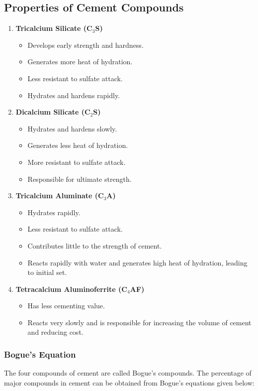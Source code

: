 \documentclass[a4paper,11pt]{book}
\begin{document}
\subsection*{Properties of Cement Compounds}
\begin{enumerate}
    \item \textbf{Tricalcium Silicate (C$_3$S)}
    \begin{itemize}
        \item Develops early strength and hardness.
        \item Generates more heat of hydration.
        \item Less resistant to sulfate attack.
        \item Hydrates and hardens rapidly.
    \end{itemize}
    \item \textbf{Dicalcium Silicate (C$_2$S)}
    \begin{itemize}
        \item Hydrates and hardens slowly.
        \item Generates less heat of hydration.
        \item More resistant to sulfate attack.
        \item Responsible for ultimate strength.
    \end{itemize}
    \item \textbf{Tricalcium Aluminate (C$_3$A)}
    \begin{itemize}
        \item Hydrates rapidly.
        \item Less resistant to sulfate attack.
        \item Contributes little to the strength of cement.
        \item Reacts rapidly with water and generates high heat of hydration, leading to initial set.
    \end{itemize}
    \item \textbf{Tetracalcium Aluminoferrite (C$_4$AF)}
    \begin{itemize}
        \item Has less cementing value.
        \item Reacts very slowly and is responsible for increasing the volume of cement and reducing cost.
    \end{itemize}
\end{enumerate}

\subsubsection*{Bogue's Equation}
The four compounds of cement are called Bogue's compounds. The percentage of major compounds in cement can be obtained from Bogue's equations given below:
\end{document}
